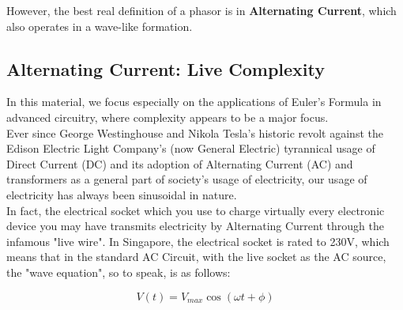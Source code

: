 \documentclass[a4paper,12pt,oneside]{book}
\begin{document}
However, the best real definition of a phasor is in \textbf{Alternating Current}, which also operates in a wave-like formation. \\

\newpage
\subsection{Alternating Current: Live Complexity}

In this material, we focus especially on the applications of Euler's Formula in advanced circuitry, where complexity appears to be a major focus. \\

Ever since George Westinghouse and Nikola Tesla's historic revolt against the Edison Electric Light Company's (now General Electric) tyrannical usage of Direct Current (DC) and its adoption of Alternating Current (AC) and transformers as a general part of society's usage of electricity, our usage of electricity has always been sinusoidal in nature. \\

In fact, the electrical socket which you use to charge virtually every electronic device you may have transmits electricity by Alternating Current through the infamous "live wire". In Singapore, the electrical socket is rated to 230V, which means that in the standard AC Circuit, with the live socket as the AC source, the "wave equation", so to speak, is as follows:

\[ V(t) = V_{max} \cos(\omega t + \phi) \]


\end{document}
